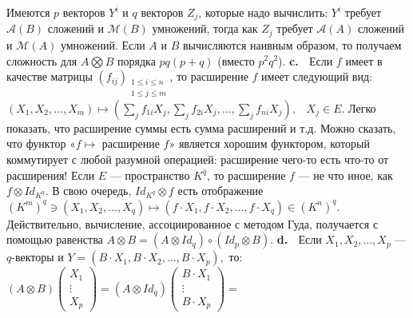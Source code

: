 \documentclass{../../template/mai_book}
\begin{document}
Имеются $p$ векторов $Y^i$ и $q$ векторов $Z_j$, которые надо вычислить:
$Y^i$ требует $\mathcal{A}(B)$ сложений и $\mathcal{M}(B)$ умножений, тогда как $Z_j$ требует $\mathcal{A}(A)$ сложений и $\mathcal{M}(A)$ умножений. Если $A$ и $B$ вычисляются наивным образом, то получаем сложность для $A \bigotimes B$ порядка $pq(p + q)$ (вместо $p^2 q^2$). \newline \newline \indent
\textbf{c.} $\;$ Если $f$ имеет в качестве матрицы $(f_{ij})_{\substack{1 \le i \le n \\ 1 \le j \le m}}$, то расширение $f$ имеет следующий вид: 
\newline \newline \indent
$(X_1 , X_2 , \dots , X_m) \longmapsto (\sum \limits_{j} f_{1i} X_j , \sum \limits_{j} f_{2i} X_j , \dots , \sum \limits_{j} f_{ni} X_j), \;\;\; X_j \in E.$
\newline \newline \newline \newline
Легко показать, что расширение суммы есть сумма расширений и т.д. Можно сказать, что функтор «$f \longmapsto $ расширение $f$» является хорошим функтором, который коммутирует с любой разумной операцией: расширение чего-то есть что-то от расширения! Если $E$ --- пространство $K^q$, то расширение $f$ --- не что иное, как $f \otimes Id_{K^q}$. В свою очередь, $Id_{K^q} \otimes f$ есть отображение $(K^m)^q \ni (X_1 , X_2 , \dots , X_q) \longmapsto (f \cdot X_1 , f \cdot X_2 , \dots , f \cdot X_q) \in (K^n)^q$. Действительно, вычисление, ассоциированное с методом Гуда, получается с помощью равенства $A \otimes B = (A \otimes Id_q) \circ (Id_p \otimes B)$. \newline \newline \indent
\textbf{d.} $\;$ Если $X_1 , X_2 , \dots , X_p$ --- $q$-векторы и $Y = (B \cdot X_1 , B \cdot X_2 , \dots , B \cdot X_p),$
\newpage
\noindent
то: \newline \newline 
$(A \otimes B)\begin{pmatrix}
X_1 \\
\vdots \\
X_p
\end{pmatrix} = (A \otimes Id_q)\begin{pmatrix}
B \cdot X_1 \\
\vdots \\
B \cdot X_p
\end{pmatrix} =$ \newline \newline \newline \indent
\end{document}
